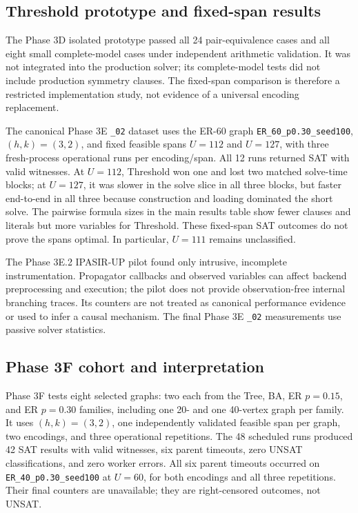 \subsection{Threshold prototype and fixed-span results}
The Phase 3D isolated prototype passed all 24 pair-equivalence cases
and all eight small complete-model cases under independent arithmetic
validation. It was not integrated into the production solver; its
complete-model tests did not include production symmetry clauses. The
fixed-span comparison is therefore a restricted implementation study,
not evidence of a universal encoding replacement.

The canonical Phase 3E \texttt{\_02} dataset uses the ER-60 graph
\texttt{ER\_60\_p0.30\_seed100}, $(h,k)=(3,2)$, and fixed feasible spans
$U=112$ and $U=127$, with three fresh-process operational runs per
encoding/span. All 12 runs returned SAT with valid witnesses. At
$U=112$, Threshold won one and lost two matched solve-time blocks; at
$U=127$, it was slower in the solve slice in all three blocks, but faster
end-to-end in all three because construction and loading dominated the
short solve. The pairwise formula sizes in the main results table show
fewer clauses and literals but more variables for Threshold. These
fixed-span SAT outcomes do not prove the spans optimal. In particular,
$U=111$ remains unclassified.

The Phase 3E.2 IPASIR-UP pilot found only intrusive, incomplete
instrumentation. Propagator callbacks and observed variables can affect
backend preprocessing and execution; the pilot does not provide
observation-free internal branching traces. Its counters are not treated
as canonical performance evidence or used to infer a causal mechanism.
The final Phase 3E \texttt{\_02} measurements use passive solver statistics.

\subsection{Phase 3F cohort and interpretation}
Phase 3F tests eight selected graphs: two each from the Tree, BA, ER
$p=0.15$, and ER $p=0.30$ families, including one 20- and one
40-vertex graph per family. It uses $(h,k)=(3,2)$, one independently
validated feasible span per graph, two encodings, and three operational
repetitions. The 48 scheduled runs produced 42 SAT results with valid
witnesses, six parent timeouts, zero UNSAT classifications, and zero
worker errors. All six parent timeouts occurred on
\texttt{ER\_40\_p0.30\_seed100} at $U=60$, for both encodings and all
three repetitions. Their final counters are unavailable; they are
right-censored outcomes, not UNSAT.


